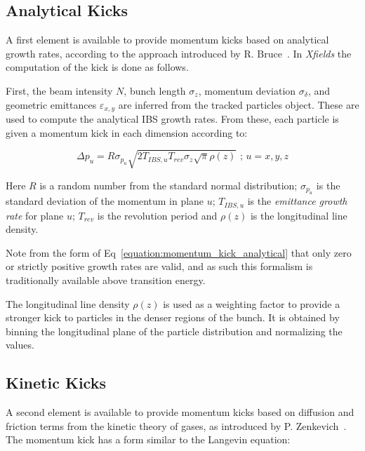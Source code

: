 \subsection{Analytical Kicks}
\label{subsection:analytical_kicks}

A first element is available to provide momentum kicks based on analytical growth rates, according to the approach introduced by R. Bruce~\cite{PRAB:Bruce:IBSAnalyticalKick}.
In \textit{Xfields} the computation of the kick is done as follows.
\newline

First, the beam intensity \(N\), bunch length \(\sigma_z\), momentum deviation \(\sigma_{\delta}\), and geometric emittances \(\varepsilon_{x,y}\) are inferred from the tracked particles object.
These are used to compute the analytical IBS growth rates.
From these, each particle is given a momentum kick in each dimension according to:

\begin{equation}
    \boxed{\Delta p_u = R \sigma_{p_u} \sqrt{ 2 T_{IBS,u} T_{rev} \sigma_z \sqrt{\pi} \rho(z)} \text{ ;   } u=x,y,z}
    \label{equation:momentum_kick_analytical}
\end{equation}

Here \(R\) is a random number from the standard normal distribution; \(\sigma_{p_u}\) is the standard deviation of the momentum in plane \(u\); \(T_{IBS,u}\) is the \textit{emittance growth rate} for plane \(u\); \(T_{rev}\) is the revolution period and \(\rho(z)\) is the longitudinal line density.
\newline

Note from the form of Eq~\eqref{equation:momentum_kick_analytical} that only zero or strictly positive growth rates are valid, and as such this formalism is traditionally available above transition energy.
\newline

The longitudinal line density \(\rho(z)\) is used as a weighting factor to provide a stronger kick to particles in the denser regions of the bunch.
It is obtained by binning the longitudinal plane of the particle distribution and normalizing the values.

\subsection{Kinetic Kicks}
\label{subsection:kinetic_kicks}

A second element is available to provide momentum kicks based on diffusion and friction terms from the kinetic theory of gases, as introduced by P. Zenkevich~\cite{NuclInstr:Zenkevich:IBSKineticKick}.
The momentum kick has a form similar to the Langevin equation:

